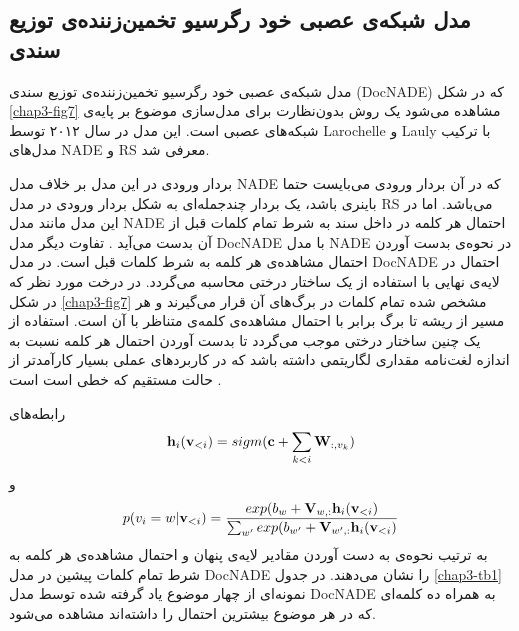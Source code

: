 	\subsection{مدل شبکه‌‌ی عصبی خود رگرسیو تخمین‌زننده‌ی توزیع سندی}
	\label{chap3sec3sub6}
مدل شبکه‌‌ی عصبی خود رگرسیو تخمین‌زننده‌ی توزیع سندی
(DocNADE)
که در شکل
\ref{chap3-fig7}
مشاهده می‌‌شود یک روش بدون‌نظارت برای مدل‌سازی موضوع بر پایه‌ی شبکه‌های عصبی است. این مدل در سال ۲۰۱۲ توسط
Larochelle
و
Lauly \cite{larochelle2012neural}
با ترکیب مدل‌های
NADE
و
RS
معرفی‌ شد.

 بردار ورودی در این مدل بر خلاف مدل
NADE
که در آن بردار ورودی می‌‌بایست حتما باینری باشد، یک بردار چندجمله‌ای به شکل بردار ورودی در مدل
RS
می‌باشد. اما در این مدل مانند مدل
NADE
احتمال هر کلمه در داخل سند به شرط تمام کلمات قبل از آن بدست می‌‌آید
\cite{larochelle2012neural}.
 تفاوت دیگر مدل
DocNADE
با مدل
NADE
در نحوه‌ی بدست آوردن احتمال مشاهده‌ی هر کلمه به شرط کلمات قبل است. در مدل
DocNADE
احتمال در لایه‌ی نهایی با استفاده از یک ساختار درختی محاسبه می‌‌گردد. در درخت مورد نظر که در شکل
\ref{chap3-fig7}
مشخص شده تمام کلمات در برگ‌های آن قرار می‌‌گیرند و هر مسیر از ریشه تا برگ برابر با احتمال مشاهده‌ی ‌کلمه‌ی متناظر با آن است. استفاده از یک چنین ساختار درختی موجب می‌‌گردد تا بدست آوردن احتمال هر کلمه نسبت به اندازه لغت‌نامه مقداری لگاریتمی داشته باشد که در کاربرد‌های عملی‌ بسیار کارآمدتر از حالت مستقیم که خطی‌ است است
\cite{larochelle2012neural}.

رابطه‌های
\begin{align}
	\centering
	\textbf{h}_i(\textbf{v}_{<i}) = sigm(\textbf{c}+\sum_{k<i}\textbf{W}_{:,v_k})
	\label{chap3-eq13}
\end{align}
و
\begin{align}
	\centering
	p(v_i=w|\textbf{v}_{<i}) = \frac{exp(b_w +\textbf{V}_{w,:}\textbf{h}_i(\textbf{v}_{<i})}{\sum_{w'}exp(b_{w'}+\textbf{V}_{w',:}\textbf{h}_i(\textbf{v}_{<i})}
	\label{chap3-eq14}
\end{align}
به ترتیب نحوه‌ی به دست آوردن مقادیر لایه‌ی پنهان و احتمال مشاهده‌ی هر کلمه به شرط تمام کلمات پیشین در مدل
DocNADE
 را نشان می‌‌دهند. در جدول
\ref{chap3-tb1}
نمونه‌ای از چهار موضوع یاد گرفته شده توسط مدل
DocNADE
به همراه ده کلمه‌ای‌ که در هر موضوع بیشترین احتمال را داشته‌اند مشاهده می‌شود.

